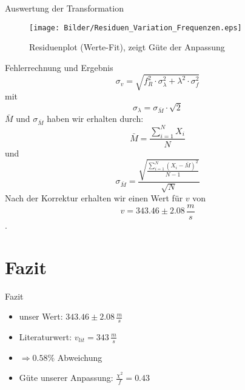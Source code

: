 \documentclass[11pt]{beamer}
\begin{document}
\begin{frame}{Auswertung der Transformation}
\begin{figure}[H]
\centering
\texttt{[image: Bilder/Residuen\_Variation\_Frequenzen.eps]}
\caption{Residuenplot (Werte-Fit), zeigt Güte der Anpassung}
\end{figure}
\end{frame}

\begin{frame}{Fehlerrechnung und Ergebnis}
\begin{equation}
\sigma_v = \sqrt{f_R^2\cdot\sigma_{\lambda}^2 + \lambda^2\cdot\sigma_f^2}
\end{equation}
mit
\begin{equation}
\sigma_{\lambda} = \sigma_{\bar{M}}\cdot\sqrt{2}
\end{equation}
$\bar{M}$ und $\sigma_{\bar{M}}$ haben wir erhalten durch:
\begin{equation}
\bar{M} = \frac{\sum_{i=1}^{N}{X_i}}{N}
\end{equation}
und
\begin{equation}
\sigma_{\bar{M}}=\frac{\sqrt{\frac{\sum_{i=1}^{N}({X_i-\bar{M}})^2}{N-1}}}{\sqrt{N}}
\end{equation}
Nach der Korrektur erhalten wir einen Wert für $v$ von
\begin{equation}
v = 343.46 \pm 2.08\,\frac{m}{s}
\end{equation}.
\end{frame}

\section{Fazit}
\begin{frame}{Fazit}
\begin{itemize}
\item unser Wert: $343.46 \pm 2.08\,\frac{m}{s}$
\item Literaturwert: $v_{lit}=343\,\frac{m}{s}$
\item $\Rightarrow 0.58\%$ Abweichung
\\
\item Güte unserer Anpassung: $\frac{\chi^2}{f} = 0.43$
\end{itemize}
\end{frame}
\end{document}
